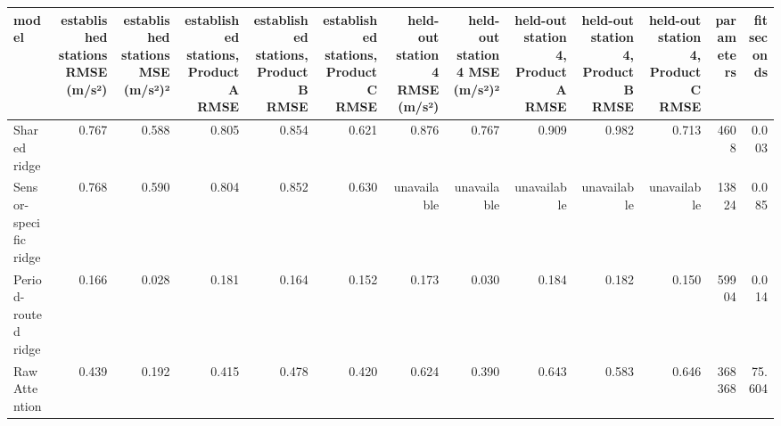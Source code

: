 \begin{tabular}{lrrrrrrrrrrrr}
\toprule
model & established stations RMSE (m/s²) & established stations MSE (m/s²)² & established stations, Product A RMSE & established stations, Product B RMSE & established stations, Product C RMSE & held-out station 4 RMSE (m/s²) & held-out station 4 MSE (m/s²)² & held-out station 4, Product A RMSE & held-out station 4, Product B RMSE & held-out station 4, Product C RMSE & parameters & fit seconds \\
\midrule
Shared ridge & 0.767 & 0.588 & 0.805 & 0.854 & 0.621 & 0.876 & 0.767 & 0.909 & 0.982 & 0.713 & 4608 & 0.003 \\
Sensor-specific ridge & 0.768 & 0.590 & 0.804 & 0.852 & 0.630 & unavailable & unavailable & unavailable & unavailable & unavailable & 13824 & 0.085 \\
Period-routed ridge & 0.166 & 0.028 & 0.181 & 0.164 & 0.152 & 0.173 & 0.030 & 0.184 & 0.182 & 0.150 & 59904 & 0.014 \\
Raw Attention & 0.439 & 0.192 & 0.415 & 0.478 & 0.420 & 0.624 & 0.390 & 0.643 & 0.583 & 0.646 & 368368 & 75.604 \\
\bottomrule
\end{tabular}
